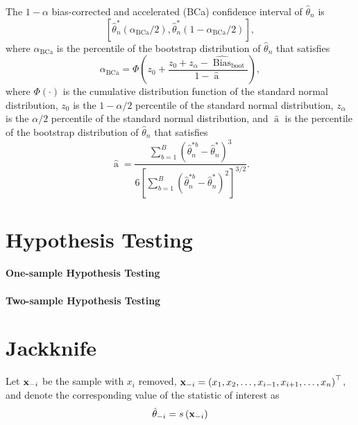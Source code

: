 The \(1-\alpha\) bias-corrected and accelerated (BCa) confidence interval of \(\hat{\theta}_{n}\) is
\begin{equation}
	\left[\hat{\theta}_{n}^{*}\left(\alpha_{\text{BCa}}/2\right),\hat{\theta}_{n}^{*}\left(1-\alpha_{\text{BCa}}/2\right)\right],
\end{equation}
where \(\alpha_{\text{BCa}}\) is the percentile of the bootstrap distribution of \(\hat{\theta}_{n}\) that satisfies
\begin{equation}
	\alpha_{\text{BCa}}=\Phi\left(z_{0}+\frac{z_{0}+z_{\alpha}-\widehat{\operatorname{Bias}}_{\text{boot}}}{1-\widehat{\operatorname{a}}}\right),
\end{equation}
where \(\Phi(\cdot)\) is the cumulative distribution function of the standard normal distribution, \(z_{0}\) is the \(1-\alpha/2\) percentile of the standard normal distribution, \(z_{\alpha}\) is the \(\alpha/2\) percentile of the standard normal distribution, and \(\widehat{\operatorname{a}}\) is the percentile of the bootstrap distribution of \(\hat{\theta}_{n}\) that satisfies
\begin{equation}
	\widehat{\operatorname{a}}=\frac{\sum_{b=1}^{B}{\left(\hat{\theta}_{n}^{*b}-\hat{\theta}_{n}^{*}\right)}^{3}}{6{\left[\sum_{b=1}^{B}\left(\hat{\theta}_{n}^{*b}-\hat{\theta}_{n}^{*}\right)^{2}\right]}^{3/2}}.
\end{equation}

\section{Hypothesis Testing}

\paragraph{One-sample Hypothesis Testing}

\paragraph{Two-sample Hypothesis Testing}

\section{Jackknife}

Let \(\mathbf{x}_{-i}\) be the sample with \(x_{i}\) removed, \(\mathbf{x}_{-i}=\left(x_{1},x_{2},\ldots,x_{i-1},x_{i+1},\ldots,x_{n}\right)^{\top}\), and denote the corresponding value of the statistic of interest as
\begin{equation}
	\hat{\theta}_{-i}=s\left(\mathbf{x}_{-i}\right)
\end{equation}

